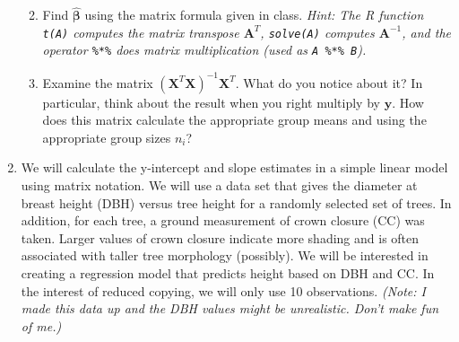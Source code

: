 \documentclass[]{book}
\theoremstyle{definition}
\theoremstyle{definition}
\theoremstyle{remark}
\begin{document}
\begin{enumerate}
  \begin{enumerate}
  \def\labelenumii{\alph{enumii})}
  \setcounter{enumii}{2}
  \item
    Find \(\hat{\boldsymbol{\beta}}\) using the matrix formula given in
    class. \emph{Hint: The R function \texttt{t(A)} computes the matrix
    transpose \(\mathbf{A}^{T}\), \texttt{solve(A)} computes
    \(\mathbf{A}^{-1}\), and the operator \texttt{\%*\%} does matrix
    multiplication (used as \texttt{A\ \%*\%\ B}).}
  \item
    Examine the matrix
    \(\left(\mathbf{X}^{T}\mathbf{X}\right)^{-1}\mathbf{X}^{T}\). What
    do you notice about it? In particular, think about the result when
    you right multiply by \(\mathbf{y}\). How does this matrix calculate
    the appropriate group means and using the appropriate group sizes
    \(n_i\)?
  \end{enumerate}
\item
  We will calculate the y-intercept and slope estimates in a simple
  linear model using matrix notation. We will use a data set that gives
  the diameter at breast height (DBH) versus tree height for a randomly
  selected set of trees. In addition, for each tree, a ground
  measurement of crown closure (CC) was taken. Larger values of crown
  closure indicate more shading and is often associated with taller tree
  morphology (possibly). We will be interested in creating a regression
  model that predicts height based on DBH and CC. In the interest of
  reduced copying, we will only use 10 observations. \emph{(Note: I made
  this data up and the DBH values might be unrealistic. Don't make fun
  of me.)}


\end{enumerate}
\end{document}
